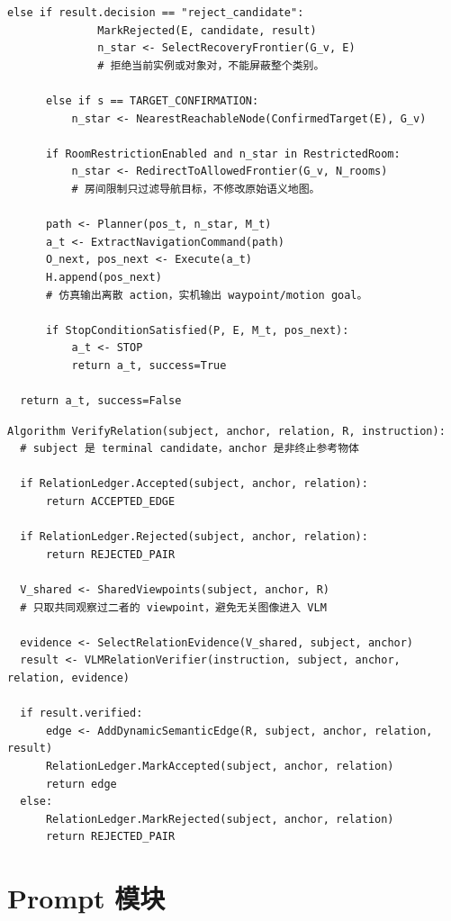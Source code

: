 \documentclass[UTF8,zihao=-4]{ctexart}
\begin{document}
\begin{lstlisting}[style=pseudo,caption={导航主循环}]
          else if result.decision == "reject_candidate":
              MarkRejected(E, candidate, result)
              n_star <- SelectRecoveryFrontier(G_v, E)
              # 拒绝当前实例或对象对，不能屏蔽整个类别。

      else if s == TARGET_CONFIRMATION:
          n_star <- NearestReachableNode(ConfirmedTarget(E), G_v)

      if RoomRestrictionEnabled and n_star in RestrictedRoom:
          n_star <- RedirectToAllowedFrontier(G_v, N_rooms)
          # 房间限制只过滤导航目标，不修改原始语义地图。

      path <- Planner(pos_t, n_star, M_t)
      a_t <- ExtractNavigationCommand(path)
      O_next, pos_next <- Execute(a_t)
      H.append(pos_next)
      # 仿真输出离散 action，实机输出 waypoint/motion goal。

      if StopConditionSatisfied(P, E, M_t, pos_next):
          a_t <- STOP
          return a_t, success=True

  return a_t, success=False
\end{lstlisting}

\begin{lstlisting}[style=pseudo,caption={动态关系验证}]
Algorithm VerifyRelation(subject, anchor, relation, R, instruction):
  # subject 是 terminal candidate，anchor 是非终止参考物体

  if RelationLedger.Accepted(subject, anchor, relation):
      return ACCEPTED_EDGE

  if RelationLedger.Rejected(subject, anchor, relation):
      return REJECTED_PAIR

  V_shared <- SharedViewpoints(subject, anchor, R)
  # 只取共同观察过二者的 viewpoint，避免无关图像进入 VLM

  evidence <- SelectRelationEvidence(V_shared, subject, anchor)
  result <- VLMRelationVerifier(instruction, subject, anchor, relation, evidence)

  if result.verified:
      edge <- AddDynamicSemanticEdge(R, subject, anchor, relation, result)
      RelationLedger.MarkAccepted(subject, anchor, relation)
      return edge
  else:
      RelationLedger.MarkRejected(subject, anchor, relation)
      return REJECTED_PAIR
\end{lstlisting}

\section{Prompt 模块}
\end{document}
